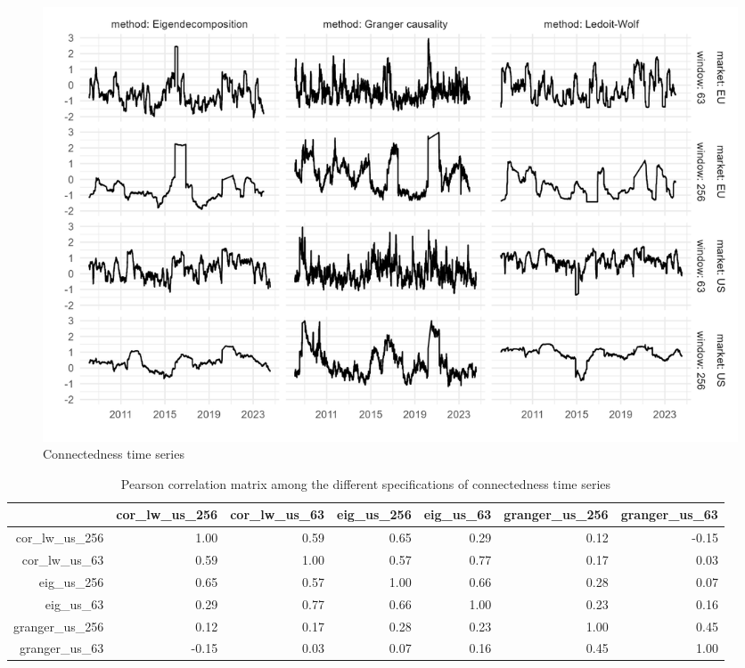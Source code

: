 \documentclass[12pt]{article}
\begin{document}
\begin{figure}
	\centering
	\includegraphics[scale = 0.8]{img/connect_ts_app.png}
	\caption{Connectedness time series}
	\label{figure:connect_ts_app}
\end{figure}

\begin{table}[ht]
	\centering
	\begin{tabular}{rrrrrrr}
		\hline
		& cor\_lw\_us\_256 & cor\_lw\_us\_63 & eig\_us\_256 & eig\_us\_63 & granger\_us\_256 & granger\_us\_63 \\ 
		\hline
		cor\_lw\_us\_256 & 1.00 & 0.59 & 0.65 & 0.29 & 0.12 & -0.15 \\ 
		cor\_lw\_us\_63 & 0.59 & 1.00 & 0.57 & 0.77 & 0.17 & 0.03 \\ 
		eig\_us\_256 & 0.65 & 0.57 & 1.00 & 0.66 & 0.28 & 0.07 \\ 
		eig\_us\_63 & 0.29 & 0.77 & 0.66 & 1.00 & 0.23 & 0.16 \\ 
		granger\_us\_256 & 0.12 & 0.17 & 0.28 & 0.23 & 1.00 & 0.45 \\ 
		granger\_us\_63 & -0.15 & 0.03 & 0.07 & 0.16 & 0.45 & 1.00 \\ 
		\hline
	\end{tabular}
		\caption{Pearson correlation matrix among the different specifications of connectedness time series}
		\label{figure:cor_matrix}
\end{table}
\end{document}
